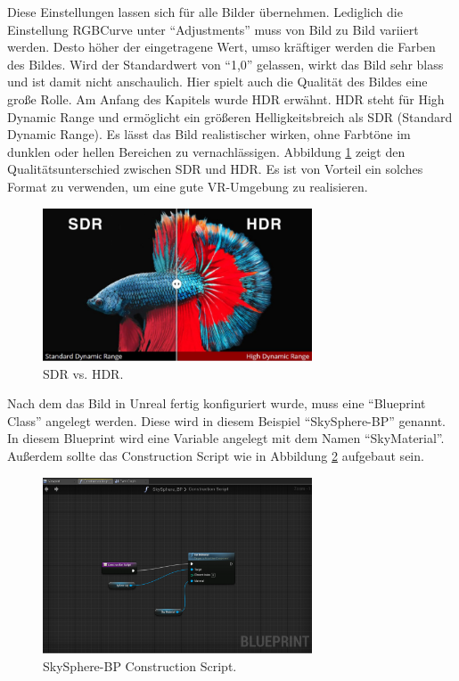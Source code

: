 Diese Einstellungen lassen sich f{\"u}r alle Bilder {\"u}bernehmen. 
Lediglich die Einstellung RGBCurve unter ``Adjustments'' muss von Bild zu Bild variiert werden. 
Desto h{\"o}her der eingetragene Wert, umso kr{\"a}ftiger werden die Farben des Bildes. 
Wird der Standardwert von ``1,0'' gelassen, wirkt das Bild sehr blass und ist damit nicht anschaulich. 
Hier spielt auch die Qualit{\"a}t des Bildes eine gro{\ss}e Rolle. 
Am Anfang des Kapitels wurde HDR erw{\"a}hnt. 
HDR steht f{\"u}r High Dynamic Range und erm{\"o}glicht ein gr{\"o}{\ss}eren Helligkeitsbreich als SDR (Standard Dynamic Range). 
Es l{\"a}sst das Bild realistischer wirken, ohne Farbt{\"o}ne im dunklen oder hellen Bereichen zu vernachl{\"a}ssigen\cite{eizo19}.
Abbildung \ref{fig-sdr-hdr} zeigt den Qualit{\"a}tsunterschied zwischen SDR und HDR.
Es ist von Vorteil ein solches Format zu verwenden, um eine gute VR-Umgebung zu realisieren. \\

\begin{figure}[H] \centering
\includegraphics[width=8cm]{Images/sdr.png} 
\caption[SDR vs. HDR]{SDR vs. HDR\cite{finch19}.}
\label{fig-sdr-hdr} 
\end{figure}


Nach dem das Bild in Unreal fertig konfiguriert wurde, muss eine ``Blueprint Class'' angelegt werden. 
Diese wird in diesem Beispiel ``SkySphere-BP'' genannt. 
In diesem Blueprint wird eine Variable angelegt mit dem Namen ``SkyMaterial''. Au{\ss}erdem sollte das Construction Script wie in Abbildung \ref{fig-skysphere} aufgebaut sein. \\

\begin{figure}[H] \centering
\includegraphics[width=8cm]{Images/skysphere.png} 
\caption{SkySphere-BP Construction Script.}
\label{fig-skysphere} 
\end{figure}


